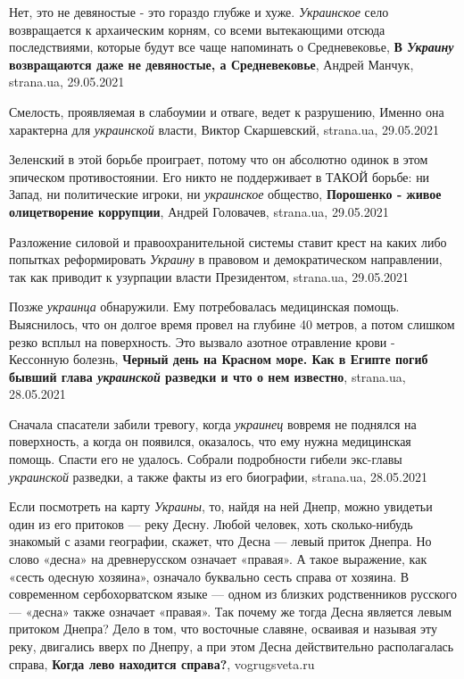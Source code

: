 Нет, это не девяностые - это гораздо глубже и хуже. \emph{Украинское} село
возвращается к архаическим корням, со всеми вытекающими отсюда последствиями,
которые будут все чаще напоминать о Средневековье, \textbf{В \emph{Украину}
возвращаются даже не девяностые, а Средневековье}, Андрей Манчук, strana.ua,
29.05.2021

Смелость, проявляемая в слабоумии и отваге, ведет к разрушению, Именно она
характерна для \emph{украинской} власти, Виктор Скаршевский, strana.ua, 29.05.2021

Зеленский в этой борьбе проиграет, потому что он абсолютно одинок в этом
эпическом противостоянии. Его никто не поддерживает в ТАКОЙ борьбе: ни Запад,
ни политические игроки, ни \emph{украинское} общество, \textbf{Порошенко -
живое олицетворение коррупции}, Андрей Головачев, strana.ua, 29.05.2021

Разложение силовой и правоохранительной системы ставит крест на каких либо
попытках реформировать \emph{Украину} в правовом и демократическом направлении, так
как приводит к узурпации власти Президентом, strana.ua, 29.05.2021

Позже \emph{украинца} обнаружили. Ему потребовалась медицинская помощь. Выяснилось,
что он долгое время провел на глубине 40 метров, а потом слишком резко всплыл
на поверхность. Это вызвало азотное отравление крови - Кессонную болезнь,
\textbf{Черный день на Красном море. Как в Египте погиб бывший глава
\emph{украинской} разведки и что о нем известно}, strana.ua, 28.05.2021

Сначала спасатели забили тревогу, когда \emph{украинец} вовремя не поднялся на
поверхность, а когда он появился, оказалось, что ему нужна медицинская помощь.
Спасти его не удалось.  Собрали подробности гибели экс-главы \emph{украинской}
разведки, а также факты из его биографии, strana.ua, 28.05.2021

Если посмотреть на карту \emph{Украины}, то, найдя на ней Днепр, можно увидетьи
один из его притоков — реку Десну.  Любой человек, хоть сколько-нибудь знакомый
с азами географии, скажет, что Десна — левый приток Днепра. Но слово «десна» на
древнерусском означает «правая». А такое выражение, как «сесть одесную
хозяина», означало буквально сесть справа от хозяина.  В современном
сербохорватском языке — одном из близких родственников русского — «десна» также
означает «правая». Так почему же тогда Десна является левым притоком Днепра?
Дело в том, что восточные славяне, осваивая и называя эту реку, двигались вверх
по Днепру, а при этом Десна действительно располагалась справа, \textbf{Когда
лево находится справа?}, vogrugsveta.ru

